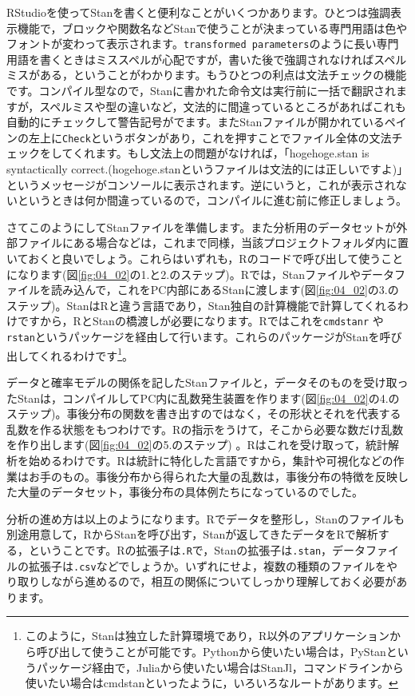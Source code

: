 \documentclass{ltjsbook}
\begin{document}
RStudioを使ってStanを書くと便利なことがいくつかあります。ひとつは強調表示機能で，ブロックや関数名などStanで使うことが決まっている専門用語は色やフォントが変わって表示されます。\verb|transformed parameters|のように長い専門用語を書くときはミススペルが心配ですが，書いた後で強調されなければスペルミスがある，ということがわかります。もうひとつの利点は文法チェックの機能です。コンパイル型なので，Stanに書かれた命令文は実行前に一括で翻訳されますが，スペルミスや型の違いなど，文法的に間違っているところがあればこれも自動的にチェックして警告記号がでます。またStanファイルが開かれているペインの左上に\verb|Check|というボタンがあり，これを押すことでファイル全体の文法チェックをしてくれます。もし文法上の問題がなければ，「hogehoge.stan is syntactically correct.(hogehoge.stanというファイルは文法的には正しいですよ)」というメッセージがコンソールに表示されます。逆にいうと，これが表示されないというときは何か間違っているので，コンパイルに進む前に修正しましょう。

さてこのようにしてStanファイルを準備します。また分析用のデータセットが外部ファイルにある場合などは，これまで同様，当該プロジェクトフォルダ内に置いておくと良いでしょう。これらはいずれも，Rのコードで呼び出して使うことになります(図\ref{fig:04_02}の1.と2.のステップ)。Rでは，Stanファイルやデータファイルを読み込んで，これをPC内部にあるStanに渡します(図\ref{fig:04_02}の3.のステップ)。StanはRと違う言語であり，Stan独自の計算機能で計算してくれるわけですから，RとStanの橋渡しが必要になります。Rではこれを\verb|cmdstanr| や\verb|rstan|というパッケージを経由して行います。これらのパッケージがStanを呼び出してくれるわけです\footnote{このように，Stanは独立した計算環境であり，R以外のアプリケーションから呼び出して使うことが可能です。Pythonから使いたい場合は，PyStanというパッケージ経由で，Juliaから使いたい場合はStanJl，コマンドラインから使いたい場合はcmdstanといったように，いろいろなルートがあります。}。

データと確率モデルの関係を記したStanファイルと，データそのものを受け取ったStanは，コンパイルしてPC内に乱数発生装置を作ります(図\ref{fig:04_02}の4.のステップ)。事後分布の関数を書き出すのではなく，その形状とそれを代表する乱数を作る状態をもつわけです。Rの指示をうけて，そこから必要な数だけ乱数を作り出します(図\ref{fig:04_02}の5.のステップ) 。Rはこれを受け取って，統計解析を始めるわけです。Rは統計に特化した言語ですから，集計や可視化などの作業はお手のもの。事後分布から得られた大量の乱数は，事後分布の特徴を反映した大量のデータセット，事後分布の具体例たちになっているのでした。

分析の進め方は以上のようになります。Rでデータを整形し，Stanのファイルも別途用意して，RからStanを呼び出す，Stanが返してきたデータをRで解析する，ということです。Rの拡張子は\verb|.R|で，Stanの拡張子は\verb|.stan|，データファイルの拡張子は\verb|.csv|などでしょうか。いずれにせよ，複数の種類のファイルをやり取りしながら進めるので，相互の関係についてしっかり理解しておく必要があります。
\end{document}
